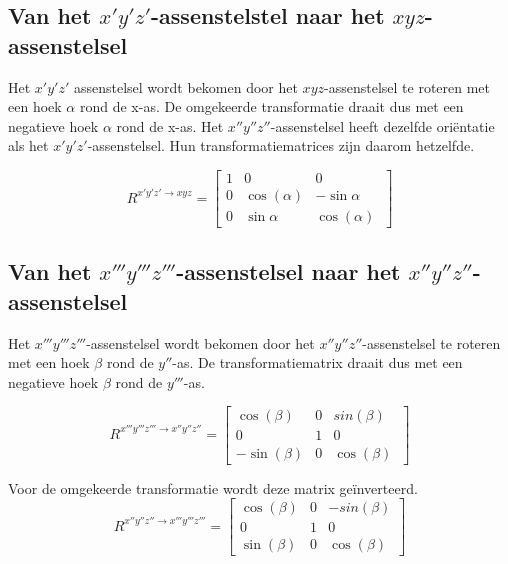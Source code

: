 
\subsection{Van het $x'y'z'$-assenstelstel naar het $xyz$-assenstelsel}
Het $x'y'z'$ assenstelsel wordt bekomen door het $xyz$-assenstelsel te roteren met een hoek $\alpha$ rond de x-as. De omgekeerde transformatie draait dus met een negatieve hoek $\alpha$ rond de x-as. Het $x''y''z''$-assenstelsel heeft dezelfde ori\"entatie als het $x'y'z'$-assenstelsel. Hun transformatiematrices zijn daarom hetzelfde.

\begin{equation*}
R^{x'y'z' \rightarrow xyz}=
  \begin{bmatrix}
    1 & 0 & 0\\
    0 & \cos(\alpha) & -\sin{\alpha}\\ 
    0 & \sin{\alpha} & \cos(\alpha)\
    \end{bmatrix}
\end{equation*}



\subsection{Van het $x'''y'''z'''$-assenstelsel naar het $x''y''z''$-assenstelsel}
Het $x'''y'''z'''$-assenstelsel wordt bekomen door het $x''y''z''$-assenstelsel te roteren met een hoek $\beta$ rond de $y''$-as. De transformatiematrix draait dus met een negatieve hoek $\beta$ rond de $y'''$-as.

\begin{equation*}
R^{x'''y'''z''' \rightarrow x''y''z''}=
  \begin{bmatrix}
    \cos(\beta) & 0 & sin(\beta)\\
    0 & 1 & 0\\ 
    -\sin(\beta) & 0 & \cos(\beta)\
    \end{bmatrix}
\end{equation*}

Voor de omgekeerde transformatie wordt deze matrix ge\"inverteerd.
\begin{equation*}
R^{x''y''z'' \rightarrow x'''y'''z'''}=
  \begin{bmatrix}
    \cos(\beta) & 0 & -sin(\beta)\\
    0 & 1 & 0\\ 
    \sin(\beta) & 0 & \cos(\beta)\
    \end{bmatrix}
\end{equation*}


